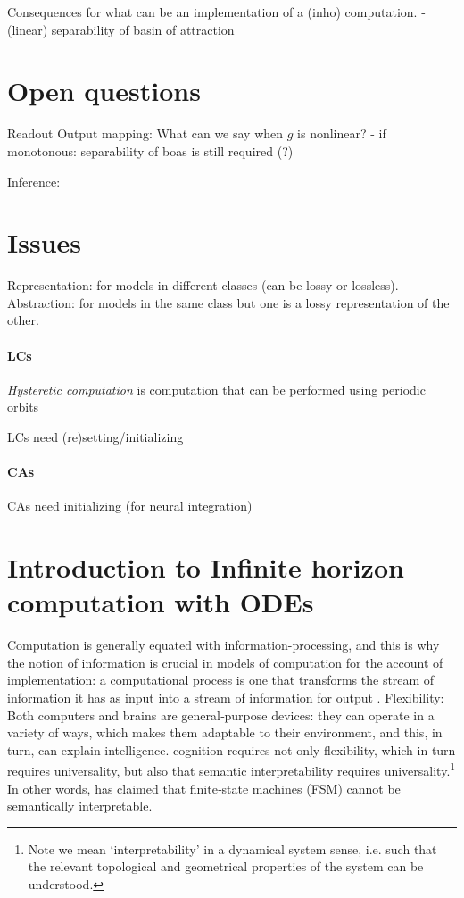 \documentclass{scrartcl}
\theoremstyle{definition}
\theoremstyle{remark}
\begin{document}
Consequences for what can be an implementation of a (inho) computation.
- (linear) separability of basin of attraction




\section*{Open questions}

Readout \citep{myers2022}
Output mapping: What can we say when $g$ is nonlinear?
- if monotonous: separability of boas is still required (?)


Inference: 


\section*{Issues}

Representation: for models in different classes (can be lossy or lossless).
Abstraction: for models in the same class but one is a lossy representation of the other.


\paragraph{LCs}
\emph{Hysteretic computation} is computation that can be performed using periodic orbits

LCs need (re)setting/initializing

\paragraph{CAs}
CAs need initializing (for neural integration)



\newpage
\section{Introduction to Infinite horizon computation with ODEs}	
Computation is generally equated with information-processing, and this is why the notion of information is crucial in models of computation for the account of implementation: a computational process is one that transforms the stream of information it has as input into a stream of information for output \citep{milkowski2014}.
Flexibility: Both computers and brains are general‑purpose devices: they can operate in a variety of ways, which makes them adaptable to their environment, and this, in turn, can explain intelligence. \citep{milkowski2018computermetaphor}
cognition requires not only flexibility, which in turn requires universality, but also that semantic interpretability requires universality.\footnote{Note we mean ‘interpretability’ in a dynamical system sense, i.e. such that the relevant topological and geometrical properties of the system can be understood.}
 In other words, \citep{pylyshyn1984} has claimed that finite‑state machines (FSM) cannot be semantically interpretable.	
\end{document}
